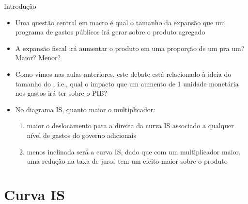 \documentclass[10pt]{beamer}
\begin{document}
\begin{frame}{Introdução}
    \begin{itemize}
        \item Uma questão central em macro é qual o tamanho da expansão que um programa de gastos públicos irá gerar sobre o produto agregado\bigskip

        \item A expansão fiscal irá aumentar o produto em uma proporção de um pra um? Maior? Menor?\bigskip

        \item Como vimos nas aulas anteriores, este debate está relacionado à ideia do tamanho do , i.e., qual o impacto que um aumento de 1 unidade monetária nos gastos irá ter sobre o PIB?\bigskip

        \item No diagrama IS, quanto maior o multiplicador:\bigskip

        \begin{enumerate}
            \item maior o deslocamento para a direita da curva IS associado a qualquer nível de gastos do governo adicionais\medskip

            \item menos inclinada será a curva IS, dado que com um multiplicador maior, uma redução na taxa de juros tem um efeito maior sobre o produto
        \end{enumerate}
    \end{itemize}
\end{frame}

\section{Curva IS}
\end{document}
